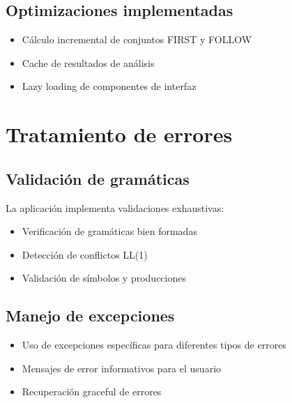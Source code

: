 \subsection{Optimizaciones implementadas}

\begin{itemize}
    \item Cálculo incremental de conjuntos FIRST y FOLLOW
    \item Cache de resultados de análisis
    \item Lazy loading de componentes de interfaz
\end{itemize}

\section{Tratamiento de errores}

\subsection{Validación de gramáticas}

La aplicación implementa validaciones exhaustivas:

\begin{itemize}
    \item Verificación de gramáticas bien formadas
    \item Detección de conflictos LL(1)
    \item Validación de símbolos y producciones
\end{itemize}

\subsection{Manejo de excepciones}

\begin{itemize}
    \item Uso de excepciones específicas para diferentes tipos de errores
    \item Mensajes de error informativos para el usuario
    \item Recuperación graceful de errores
\end{itemize}

